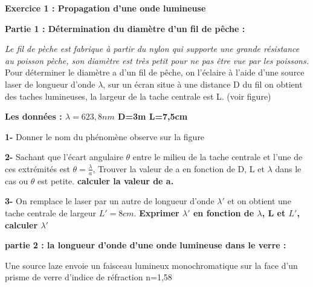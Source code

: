 \documentclass[12pt, french]{article}
\begin{document}
\begin{center}
\end{center}

\vspace{-0.2cm}



\begin{Box2}{\textbf{Exercice 1 : Propagation d’une onde lumineuse }}

	\textbf{ Partie 1 : Détermination du diamètre d’un fil de pêche :}

	\emph{ Le fil de pèche est fabrique à partir du nylon qui supporte une grande résistance au poisson pèche, son diamètre est très petit pour ne pas être vue par les poissons.}
\\Pour déterminer le diamètre a d’un fil de pêche, on l’éclaire à l’aide d’une
 source laser de longueur d’onde $\lambda$, sur un écran situe à une distance D du fil
on obtient des taches lumineuses, la largeur de la tache centrale est L. (voir figure)

\textbf{Les données : $\lambda=623,8nm$ \hspace{1cm} D=3m \hspace{1cm} L=7,5cm}

\textbf{1- }Donner le nom du phénomène observe sur la figure

\textbf{2- }Sachant que l’écart angulaire $\theta$ entre le milieu de la tache centrale et l’une de ces extrémités est $\theta = \frac{\lambda}{a}$, Trouver la valeur de a en fonction de D, L et $\lambda$ dans le cas ou $\theta$ est petite. \textbf{calculer la valeur de a.}

\textbf{3- }On remplace le laser par un autre de longueur d’onde $\lambda'$ et on obtient une tache centrale de largeur $L'=8cm$. \textbf{Exprimer $\lambda'$ en fonction de $\lambda$, L et $L'$, calculer $\lambda'$
}

\vspace{0.5cm}

\textbf{ partie 2 : la longueur d’onde d’une onde lumineuse dans le verre :}

Une source laze envoie un faisceau lumineux monochromatique sur la face d’un prisme de verre
d’indice de réfraction n=1,58


\end{Box2}
\end{document}
